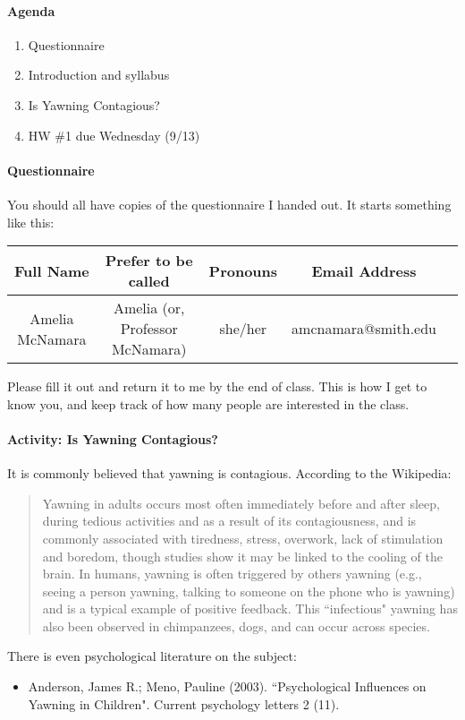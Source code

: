 \documentclass[10pt]{article}\usepackage[]{graphicx}\usepackage[]{color}
\begin{document}
\paragraph{Agenda}
\begin{enumerate}
  \itemsep0em
  \item Questionnaire
  \item Introduction and syllabus
  \item Is Yawning Contagious?
  \item HW \#1 due Wednesday (9/13)
\end{enumerate}

\paragraph{Questionnaire}

You should all have copies of the questionnaire I handed out. It starts something like this:

\begin{center}
\begin{tabular}{|c|c|c|c|c|}
  \hline
	Full Name & Prefer to be called & Pronouns & Email Address \\
	\hline 
	Amelia McNamara & Amelia (or, Professor McNamara) & she/her & amcnamara@smith.edu \\
	\hline
\end{tabular}
\end{center}

Please fill it out and return it to me by the end of class. This is how I get to know you, and keep track of how many people are interested in the class. 

\paragraph{Activity: Is Yawning Contagious?}

It is commonly believed that yawning is contagious. According to the Wikipedia:
\begin{quotation}
Yawning in adults occurs most often immediately before and after sleep, during tedious activities and as a result of its contagiousness, and is commonly associated with tiredness, stress, overwork, lack of stimulation and boredom, though studies show it may be linked to the cooling of the brain. In humans, yawning is often triggered by others yawning (e.g., seeing a person yawning, talking to someone on the phone who is yawning) and is a typical example of positive feedback. This ``infectious" yawning has also been observed in chimpanzees, dogs, and can occur across species.
\end{quotation}
There is even psychological literature on the subject:
\begin{itemize}
  \item Anderson, James R.; Meno, Pauline (2003). ``Psychological Influences on Yawning in Children". Current psychology letters 2 (11).
\end{itemize}
\end{document}
